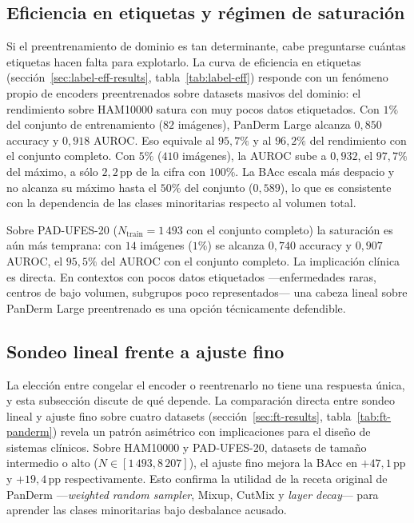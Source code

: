 \subsection{Eficiencia en etiquetas y régimen de saturación}
\label{sec:disc-eficiencia}

Si el preentrenamiento de dominio es tan determinante, cabe
preguntarse cuántas etiquetas hacen falta para explotarlo. La curva
de eficiencia en etiquetas (sección~\ref{sec:label-eff-results},
tabla~\ref{tab:label-eff}) responde con un fenómeno propio de
encoders preentrenados sobre datasets masivos del dominio: el
rendimiento sobre HAM10000 satura con muy pocos datos etiquetados.
Con $1\%$ del conjunto de entrenamiento ($82$ imágenes),
PanDerm Large alcanza $0{,}850$ accuracy y $0{,}918$ AUROC. Eso
equivale al $95{,}7\%$ y al $96{,}2\%$ del rendimiento con el
conjunto completo. Con $5\%$ ($410$ imágenes), la AUROC sube a
$0{,}932$, el $97{,}7\%$ del máximo, a sólo $2{,}2$\,pp de la
cifra con $100\%$. La BAcc escala más despacio y no alcanza su
máximo hasta el $50\%$ del conjunto ($0{,}589$), lo que es
consistente con la dependencia de las clases minoritarias respecto
al volumen total.

Sobre PAD-UFES-20 ($N_{\mathrm{train}} = 1\,493$ con el conjunto
completo) la saturación es aún más temprana: con $14$ imágenes
($1\%$) se alcanza $0{,}740$ accuracy y $0{,}907$ AUROC, el
$95{,}5\%$ del AUROC con el conjunto completo. La implicación
clínica es directa. En contextos con pocos datos etiquetados
---enfermedades raras, centros de bajo volumen, subgrupos poco
representados--- una cabeza lineal sobre PanDerm Large preentrenado
es una opción técnicamente defendible.

\subsection{Sondeo lineal frente a ajuste fino}
\label{sec:disc-lp-vs-ft}

La elección entre congelar el encoder o reentrenarlo no tiene una
respuesta única, y esta subsección discute de qué depende. La
comparación directa entre sondeo lineal y ajuste fino sobre cuatro
datasets (sección~\ref{sec:ft-results},
tabla~\ref{tab:ft-panderm}) revela un patrón asimétrico con
implicaciones para el diseño de sistemas clínicos. Sobre HAM10000 y
PAD-UFES-20, datasets de tamaño intermedio o alto
($N \in [1\,493, 8\,207]$), el ajuste fino mejora la BAcc en
$+47{,}1$\,pp y $+19{,}4$\,pp respectivamente. Esto confirma la
utilidad de la receta original de PanDerm ---\emph{weighted random
sampler}, Mixup, CutMix y \emph{layer decay}--- para aprender las
clases minoritarias bajo desbalance acusado.

